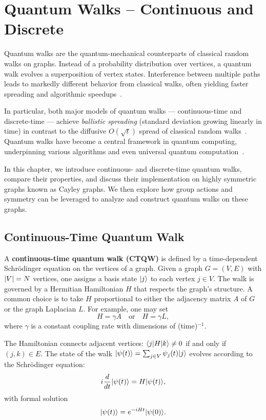 \documentclass[12pt]{report}
\begin{document}
\chapter{Quantum Walks -- Continuous and Discrete}\label{chap:quantum_walks}

Quantum walks are the quantum-mechanical counterparts of classical random walks on graphs. Instead of a probability distribution over vertices, a quantum walk evolves a superposition of vertex states. Interference between multiple paths leads to markedly different behavior from classical walks, often yielding faster spreading and algorithmic speedups~\cite{Aharonov2001}.

In particular, both major models of quantum walks --- continuous-time and discrete-time --- achieve \emph{ballistic spreading} (standard deviation growing linearly in time) in contrast to the diffusive $O(\sqrt{t})$ spread of classical random walks~\cite{Kempe2003}. Quantum walks have become a central framework in quantum computing, underpinning various algorithms and even universal quantum computation~\cite{Childs2009,Ambainis2003}.

In this chapter, we introduce continuous- and discrete-time quantum walks, compare their properties, and discuss their implementation on highly symmetric graphs known as Cayley graphs. We then explore how group actions and symmetry can be leveraged to analyze and construct quantum walks on these graphs.



\section{Continuous-Time Quantum Walk}


A \textbf{continuous-time quantum walk (CTQW)} is defined by a time-dependent Schrödinger equation on the vertices of a graph. Given a graph $G=(V,E)$ with $\lvert V\rvert=N$ vertices, one assigns a basis state $\lvert j\rangle$ to each vertex $j \in V$. The walk is governed by a Hermitian Hamiltonian $H$ that respects the graph's structure. A common choice is to take $H$ proportional to either the adjacency matrix $A$ of $G$ or the graph Laplacian $L$. For example, one may set
\[
H = \gamma A \quad \text{or} \quad H = \gamma L,
\]
where $\gamma$ is a constant coupling rate with dimensions of (time)$^{-1}$.

The Hamiltonian connects adjacent vertices: $\langle j\rvert H\lvert k\rangle \neq 0$ if and only if $(j,k) \in E$. The state of the walk $\lvert\psi(t)\rangle = \sum_{j \in V} \psi_j(t) \lvert j\rangle$ evolves according to the Schrödinger equation:
\[
i \frac{d}{dt} \lvert\psi(t)\rangle = H \lvert\psi(t)\rangle,
\]
with formal solution
\[
\lvert\psi(t)\rangle = e^{-iHt} \lvert\psi(0)\rangle.
\]
\end{document}
